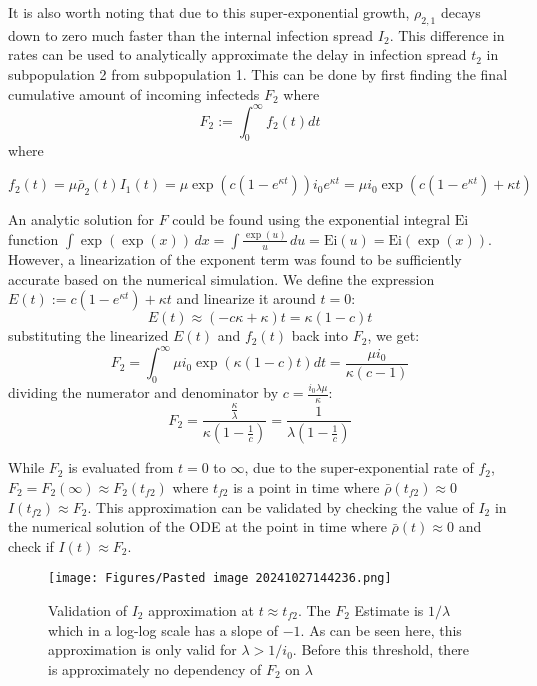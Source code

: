 \documentclass{article}
\begin{document}
It is also worth noting that due to this super-exponential growth, $\rho_{2,1}$ decays down to zero much faster than the internal infection spread $I_2$. This difference in rates can be used to analytically approximate the delay in infection spread $t_2$ in subpopulation 2 from subpopulation 1. This can be done by first finding the final cumulative amount of incoming infecteds $F_2$ where 
$$F_2:=\int_0^\infty f_2(t)dt$$
where 

$$f_2(t)=\mu \bar \rho_2(t) I_1(t) = \mu \exp\left({c \left( 1 - e^{\kappa t} \right)}\right)i_0 e^{\kappa t} = \mu i_0 \exp\left({c \left( 1 - e^{\kappa t} \right)} +\kappa t\right)$$

An analytic solution for $F$ could be found using the exponential integral $\mathrm{Ei}$ function  $\int\exp(\exp(x))\,d x=\int{\frac{\exp(u)}{u}}\,d u={\mathrm{Ei}}(u)={\mathrm{Ei}}(\exp(x))$. However, a linearization of the exponent term was found to be sufficiently accurate based on the numerical simulation. We define the expression $E(t):=c\left( 1 - e^{\kappa t} \right)+\kappa t$ and linearize it around $t=0$: 
$$E(t)\approx (-c\kappa+\kappa)t = \kappa (1-c) t$$
substituting the linearized $E(t)$ and $f_2(t)$ back into $F_2$, we get:
$$F_2=\int_0^\infty \mu i_0 \exp\left(\kappa (1-c) t \right) dt = \frac{\mu i_0}{\kappa(c-1)}$$
dividing the numerator and denominator by $c=\frac{i_{0} \lambda \mu}{\kappa}$:
\begin{equation}
F_2=\frac{\frac{\kappa}{\lambda}}{\kappa\left( 1-\frac{1}{c} \right)}=\frac{1}{\lambda\left( 1-\frac{1}{c} \right)}
\end{equation}

While $F_2$ is evaluated from $t=0$ to $\infty$, due to the super-exponential rate of $f_2$, $F_2=F_2(\infty)\approx F_2(t_{f2})$ where $t_{f2}$ is a point in time where $\bar\rho(t_{f2})\approx 0$  $I({t_{f2}})\approx F_2$. This approximation can be validated by checking the value of $I_2$ in the numerical solution of the ODE at the point in time where $\bar\rho(t)\approx 0$ and check if $I(t)\approx F_2$. 

\begin{figure}[h!]
    \centering
    \texttt{[image: Figures/Pasted image 20241027144236.png]}
    \caption{\small Validation of $I_2$ approximation at $t \approx t_{f2}$. The $F_2$ Estimate is $1/\lambda$ which in a log-log scale has a slope of $-1$. As can be seen here, this approximation is only valid for $\lambda>1/i_0$. Before this threshold, there is approximately no dependency of $F_2$ on $\lambda$ }

\end{figure}
\end{document}
